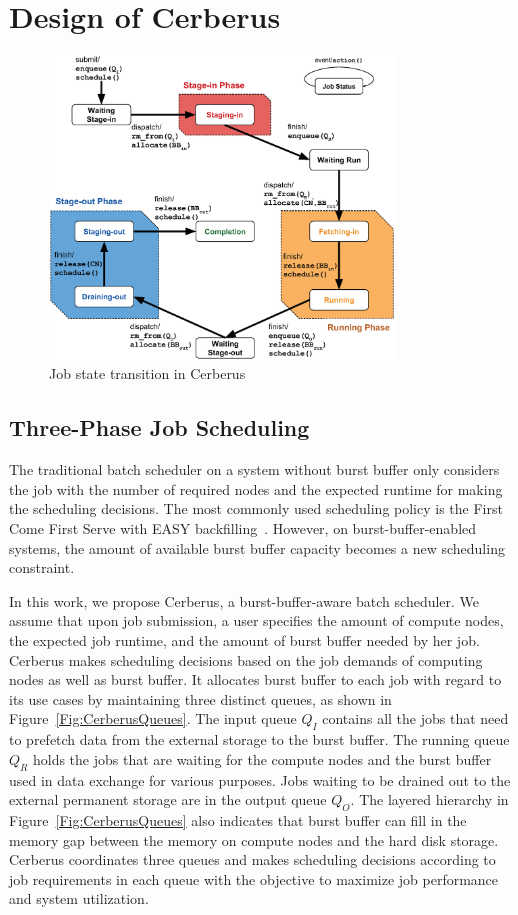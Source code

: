 \section{Design of Cerberus}
\label{Sec:Scheduler}

\begin{figure}[htp]
\centering
        \includegraphics[width=3.6in]{3PhaseJobFSM}
        \caption{Job state transition in Cerberus}
\label{Fig:JobFSM}
\end{figure}

\subsection{Three-Phase Job Scheduling}

The traditional batch scheduler on a system without burst buffer only considers
the job with the number of required nodes and the expected runtime
for making the scheduling decisions.
The most commonly used scheduling policy is the First Come First Serve with EASY backfilling~\cite{tsafrir-tpds-2007}.
However, on burst-buffer-enabled systems,
the amount of available burst buffer capacity becomes a new scheduling constraint.

In this work,
we propose Cerberus, a burst-buffer-aware batch scheduler.
We assume that upon job submission, a user specifies the amount of compute nodes, 
the expected job runtime, and the amount of burst buffer needed by her job.
Cerberus makes scheduling decisions based on the job demands of computing nodes as well as burst buffer.
It allocates burst buffer to each job with regard to its use cases
by maintaining three distinct queues, as shown in Figure~\ref{Fig:CerberusQueues}.
The input queue $Q_I$ contains all the jobs that need to prefetch data
from the external storage to the burst buffer.
The running queue $Q_R$ holds the jobs that are waiting for the compute nodes and
the burst buffer used in data exchange for various purposes.
Jobs waiting to be drained out to the external permanent storage are in the output queue $Q_O$.
The layered hierarchy in Figure~\ref{Fig:CerberusQueues} also indicates that burst buffer
can fill in the memory gap between the memory on compute nodes and the hard disk storage.
Cerberus coordinates three queues and makes scheduling decisions according to job requirements
in each queue with the objective to maximize job performance and system utilization.

